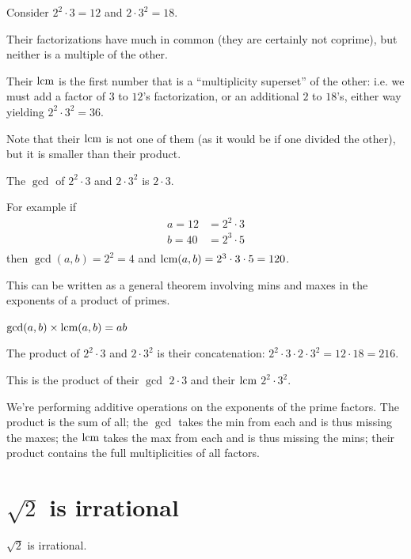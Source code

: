 \begin{example*}
Consider $2^2 \cdot 3 = 12$ and $2\cdot 3^2 = 18$.

Their factorizations have much in common (they are certainly not coprime), but neither is a
multiple of the other.

Their $\text{lcm}$ is the first number that is a ``multiplicity superset​'' of the other: i.e. we must add
a factor of $3$ to $12$'s factorization, or an additional $2$ to $18$'s, either way
yielding $2^2 \cdot 3^2 = 36$.

Note that their $\text{lcm}$ is not one of them (as it would be if one divided the other), but it is
smaller than their product.

The $\gcd$ of $2^2\cdot 3$ and $2\cdot 3^2$ is $2\cdot 3$.
\end{example*}


\begin{example*}
    For example if
  \begin{align*}
    a = 12 &= 2^2 \cdot 3 \\
    b = 40 &= 2^3 \cdot 5 \\
  \end{align*}
  then $\gcd(a, b) = 2^2 = 4$ and $\text{lcm}(a, b) = 2^3 \cdot 3 \cdot 5 = 120$.

  This can be written as a general theorem involving mins and maxes in the exponents of a product
  of primes.
\end{example*}


\begin{theorem*}
  $\gcd(a,b) \times \text{lcm}(a,b) = ab$
\end{theorem*}

\begin{example*}
  The product of  $2^2\cdot 3$ and $2\cdot 3^2$ is their concatenation: $2^2 \cdot 3 \cdot 2 \cdot 3^2 = 12 \cdot 18 = 216$.

  This is the product of their $\gcd$ $2\cdot 3$ and their $\text{lcm}$ $2^2\cdot 3^2$.
\end{example*}


\begin{intuition*}
  We're performing additive operations on the exponents of the prime factors. The product is the
  sum of all; the $\gcd$ takes the min from each and is thus missing the maxes; the $\text{lcm}$ takes
  the max from each and is thus missing the mins; their product contains the full multiplicities of
  all factors.
\end{intuition*}


\section{$\sqrt{2}$ is irrational}
\begin{theorem*}
  $\sqrt{2}$ is irrational.
\end{theorem*}

